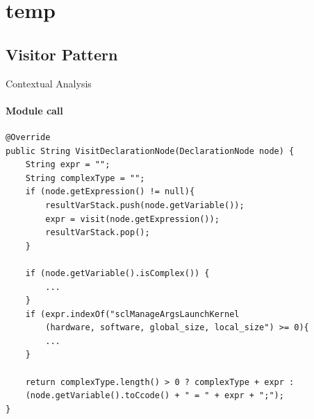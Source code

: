 \section{temp}
\subsection{Visitor Pattern}

\begin{frame}{Contextual Analysis}
\framesubtitle{Module call}



\begin{lstlisting}[float, floatplacement=H!, caption=The visit method for visiting a DeclarationNode in the code generator. ,frame=tlrb,label={lst:DeclarationNodeCodeGen}]
@Override
public String VisitDeclarationNode(DeclarationNode node) {
    String expr = "";
    String complexType = "";
    if (node.getExpression() != null){
        resultVarStack.push(node.getVariable());
        expr = visit(node.getExpression());
        resultVarStack.pop();
    }

    if (node.getVariable().isComplex()) {
        ...
    }
    if (expr.indexOf("sclManageArgsLaunchKernel
    	(hardware, software, global_size, local_size") >= 0){
        ...
    }

    return complexType.length() > 0 ? complexType + expr :
    (node.getVariable().toCcode() + " = " + expr + ";");
}
\end{lstlisting}
\end{frame}